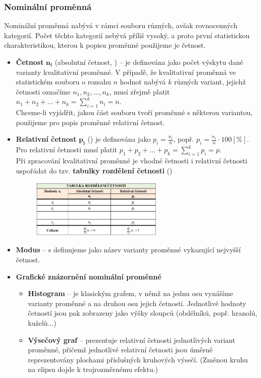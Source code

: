 \subsubsection{Nominální proměnná}
Nominální proměnná nabývá v rámci souboru různých, avšak rovnocenných kategorií. Počet těchto kategorií nebývá příliš vysoký, a proto první statistickou charakteristikou, kterou k popisu proměnné použijeme je četnost.
\begin{itemize}
	\item \textbf{Četnost} $\mathbf{n_i}$ (absolutní četnost, ) --  je definována jako počet výskytu dané varianty kvalitativní proměnné. V případě, že kvalitativní proměnná ve statistickém souboru o rozsahu $n$ hodnot  nabývá $k$ různých variant, jejichž četnosti označíme $n_1, n_2, ... , n_k$, musí zřejmě platit $n_1 + n_2 + ... + n_k = \sum\limits_{i=1}^k n_i = n$. \\
	Chceme-li vyjádřit, jakou část souboru tvoří proměnné s některou variantou, použijeme pro popis proměnné relativní četnost.

	\item \textbf{Relativní četnost} $\mathbf{p_i}$ () je definována jako $p_i = \frac{n_i}{n}$, popř. $p_i = \frac{n_i}{n} \cdot 100 [\%]$. Pro relativní četnosti musí platit $p_1 + p_2 + ... + p_k = \sum\limits_{i=1}^k p_i = p$. \\
	Při zpracování kvalitativní proměnné je vhodné četnosti i relativní četnosti uspořádat do tzv. \textbf{tabulky rozdělení četnosti} ()
				\begin{figure}[H]
				\centering
				\includegraphics[width=0.6\textwidth]{assets/13_tabl_cetnost}
				\end{figure}
	\item \textbf{Modus} -- s definujeme jako název varianty proměnné vykazující nejvyšší četnost.\\
	\item \textbf{Grafické znázornění nominální proměnné} 
	\begin{itemize}
		\item \textbf{Histogram} -- je klasickým grafem, v němž na jednu osu vynášíme varianty proměnné a na druhou osu jejich četnosti. Jednotlivé hodnoty četností jsou pak zobrazeny jako výšky sloupců (obdélníků, popř. hranolů, kuželů...)
		\item \textbf{Výsečový graf} -- prezentuje relativní četnosti jednotlivých variant proměnné, přičemž jednotlivé relativní četnosti jsou úměrně reprezentovány plochami příslušných kruhových výsečí. (Změnou kruhu na elipsu dojde k trojrozměrnému efektu.)
	\end{itemize}
\end{itemize}
